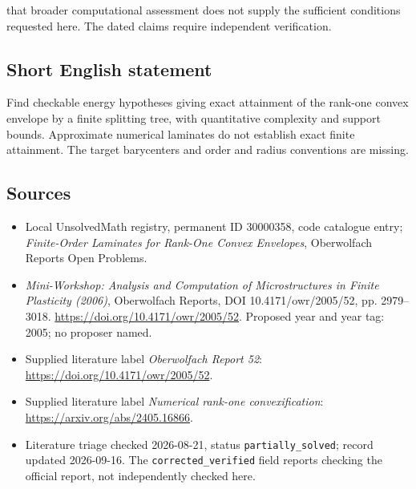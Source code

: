 \documentclass[11pt]{article}
\begin{document}
that broader computational assessment does not supply the sufficient conditions requested here. The dated claims require independent verification.
\subsection{Short English statement}
Find checkable energy hypotheses giving exact attainment of the rank-one convex envelope by a finite splitting tree, with quantitative complexity and support bounds. Approximate numerical laminates do not establish exact finite attainment. The target barycenters and order and radius conventions are missing.
\subsection{Sources}
\begin{itemize}\item Local UnsolvedMath registry, permanent ID 30000358, code catalogue entry; \emph{Finite-Order Laminates for Rank-One Convex Envelopes}, Oberwolfach Reports Open Problems.\item \emph{Mini-Workshop: Analysis and Computation of Microstructures in Finite Plasticity (2006)}, Oberwolfach Reports, DOI 10.4171/owr/2005/52, pp. 2979--3018. \url{https://doi.org/10.4171/owr/2005/52}. Proposed year and year tag: 2005; no proposer named.\item Supplied literature label \emph{Oberwolfach Report 52}: \url{https://doi.org/10.4171/owr/2005/52}.\item Supplied literature label \emph{Numerical rank-one convexification}: \url{https://arxiv.org/abs/2405.16866}.\item Literature triage checked 2026-08-21, status \texttt{partially\_solved}; record updated 2026-09-16. The \texttt{corrected\_verified} field reports checking the official report, not independently checked here.\end{itemize}
\end{document}

